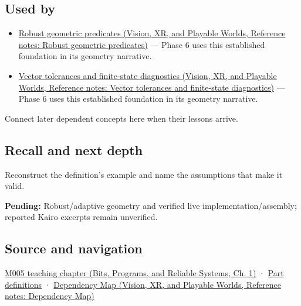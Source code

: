 \subsection{Used by}\label{appendix-5aef4f13483a-used-by}

\hypertarget{appendix-5aef4f13483a-used-by}{}

\begin{itemize}
\tightlist
\item
  \href{../07-Vision-XR-and-Playable-Worlds/main.pdf\#nameddest=appendix-341296fb3f64}{Robust geometric predicates (Vision, XR, and Playable Worlds, Reference notes: Robust geometric predicates)} --- Phase 6 uses this established foundation in its geometry narrative.
\item
  \href{../07-Vision-XR-and-Playable-Worlds/main.pdf\#nameddest=appendix-b5b83329215b}{Vector tolerances and finite-state diagnostics (Vision, XR, and Playable Worlds, Reference notes: Vector tolerances and finite-state diagnostics)} --- Phase 6 uses this established foundation in its geometry narrative.
\end{itemize}

Connect later dependent concepts here when their lessons arrive.

\subsection{Recall and next depth}\label{appendix-5aef4f13483a-recall-and-next-depth}

\hypertarget{appendix-5aef4f13483a-recall-and-next-depth}{}

Reconstruct the definition's example and name the assumptions that make it valid.

\textbf{Pending:} Robust/adaptive geometry and verified live implementation/assembly; reported Kairo excerpts remain unverified.

\subsection{Source and navigation}\label{appendix-5aef4f13483a-source-and-navigation}

\hypertarget{appendix-5aef4f13483a-source-and-navigation}{}

\href{../01-Bits-Programs-and-Reliable-Systems/main.pdf\#nameddest=01-foundations-i-ch001-when-arithmetic-meets-uncertainty}{M005 teaching chapter (Bits, Programs, and Reliable Systems, Ch. 1)} · \hyperref[appendix-fd090d982a15-m005---parts-77-88]{Part definitions} · \href{../07-Vision-XR-and-Playable-Worlds/main.pdf\#nameddest=appendix-4ad47bdd269a}{Dependency Map (Vision, XR, and Playable Worlds, Reference notes: Dependency Map)}

